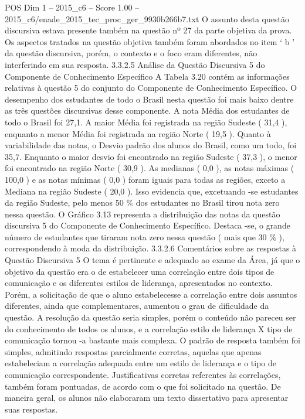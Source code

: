 \begin{textsample}{POS Dim 1 – 2015\_c6 – Score 1.00 – 2015\_c6/enade\_2015\_tec\_proc\_ger\_9930b266b7.txt}
O assunto desta questão discursiva estava presente também na questão nº 27 da parte objetiva da prova.
Os aspectos tratados na questão objetiva também foram abordados no item ‘ b ’ da questão discursiva, porém, o contexto e o foco eram diferentes, não interferindo em sua resposta. 3.3.2.5 Análise da Questão Discursiva 5 do Componente de Conhecimento Específico A Tabela 3.20 contém as informações relativas à questão 5 do conjunto do Componente de Conhecimento Específico.
O desempenho dos estudantes de todo o Brasil nesta questão foi mais baixo dentre as três questões discursivas desse componente.
A nota Média dos estudantes de todo o Brasil foi 27,1.
A maior Média foi registrada na região Sudeste ( 31,4 ), enquanto a menor Média foi registrada na região Norte ( 19,5 ).
Quanto à variabilidade das notas, o Desvio padrão dos alunos do Brasil, como um todo, foi 35,7.
Enquanto o maior desvio foi encontrado na região Sudeste ( 37,3 ), o menor foi encontrado na região Norte ( 30,9 ).
As medianas ( 0,0 ), as notas máximas ( 100,0 ) e as notas mínimas ( 0,0 ) foram iguais para todas as regiões, exceto a Mediana na região Sudeste ( 20,0 ).
Isso evidencia que, excetuando -se estudantes da região Sudeste, pelo menos 50 \% dos estudantes no Brasil tirou nota zero nessa questão.
O Gráfico 3.13 representa a distribuição das notas da questão discursiva 5 do Componente de Conhecimento Específico.
Destaca -se, o grande número de estudantes que tiraram nota zero nessa questão ( mais que 30 \% ), correspondendo à moda da distribuição. 3.3.2.6 Comentários sobre as respostas à Questão Discursiva 5 O tema é pertinente e adequado ao exame da Área, já que o objetivo da questão era o de estabelecer uma correlação entre dois tipos de comunicação e os diferentes estilos de liderança, apresentados no contexto.
Porém, a solicitação de que o aluno estabelecesse a correlação entre dois assuntos diferentes, ainda que complementares, aumentou o grau de dificuldade da questão.
A resolução da questão seria simples, porém o conteúdo não pareceu ser do conhecimento de todos os alunos, e a correlação estilo de liderança X tipo de comunicação tornou -a bastante mais complexa.
O padrão de resposta também foi simples, admitindo respostas parcialmente corretas, aquelas que apenas estabeleciam a correlação adequada entre um estilo de liderança e o tipo de comunicação correspondente.
Justificativas corretas referentes às correlações, também foram pontuadas, de acordo com o que foi solicitado na questão.
De maneira geral, os alunos não elaboraram um texto dissertativo para apresentar suas respostas.

\end{textsample}
